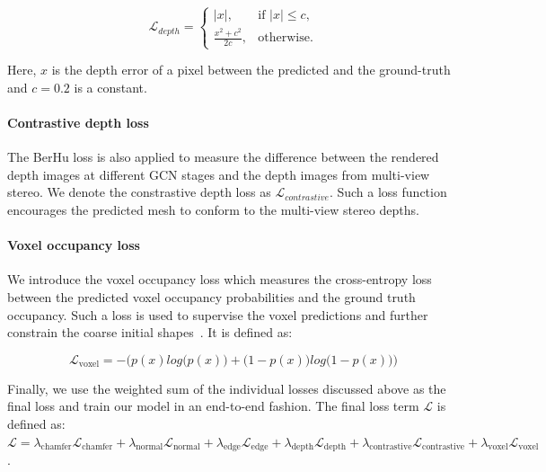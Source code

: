 \begin{equation}
  \mathcal{L}_{depth}=\begin{cases}
    |x|, & \text{if $|x| \le c$},\\
    \frac{x^2 + c^2}{2c}, & \text{otherwise}.
  \end{cases}
\end{equation}

\noindent Here, $x$ is the depth error of a pixel between the predicted and the ground-truth and $c=0.2$ is a constant.

\paragraph{Contrastive depth loss}\vspace{-4mm}
The BerHu loss is also applied to measure the difference between the rendered depth images at different GCN stages and the depth images from multi-view stereo.
We denote the constrastive depth loss as $\mathcal{L}_{contrastive}$.
Such a loss function encourages the predicted mesh to conform to the multi-view stereo depths.

\paragraph{Voxel occupancy loss}\vspace{-4mm}
We introduce the voxel occupancy loss which measures the cross-entropy loss between the predicted voxel occupancy probabilities and the ground truth occupancy.
Such a loss is used to supervise the voxel predictions and further constrain the coarse initial shapes~\cite{gkioxari2019meshrcnn}.
It is defined as:
\begin{small}
\begin{equation}
\mathcal{L}_{\text{voxel}} = -{\Big(p(x) log\big(p(x)\big) + \big(1 - p(x)\big)log\big(1 - p(x)\big)\Big)}
\end{equation}
\end{small}

Finally, we use the weighted sum of the individual losses discussed above as the final loss and train our model in an end-to-end fashion.
The final loss term $\mathcal{L}$ is defined as:
$\mathcal{L} = \lambda_{\text{chamfer}}\mathcal{L}_{\text{chamfer}} + \lambda_{\text{normal}}\mathcal{L}_{\text{normal}} + \lambda_{\text{edge}}\mathcal{L}_{\text{edge}} + \lambda_{\text{depth}}\mathcal{L}_{\text{depth}} + \lambda_{\text{contrastive}}\mathcal{L}_{\text{contrastive}} + \lambda_{\text{voxel}}\mathcal{L}_{\text{voxel}}$.
